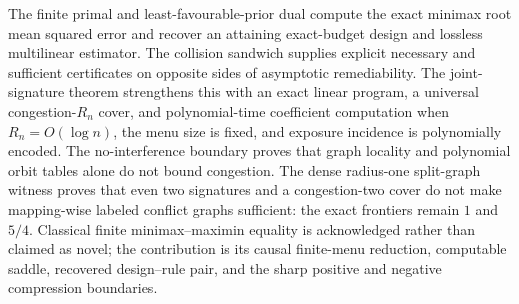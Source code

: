 The finite primal and least-favourable-prior dual compute the exact minimax root mean squared error and recover an attaining exact-budget design and lossless multilinear estimator. The collision sandwich supplies explicit necessary and sufficient certificates on opposite sides of asymptotic remediability. The joint-signature theorem strengthens this with an exact linear program, a universal congestion-\(R_n\) cover, and polynomial-time coefficient computation when \(R_n=O(\log n)\), the menu size is fixed, and exposure incidence is polynomially encoded. The no-interference boundary proves that graph locality and polynomial orbit tables alone do not bound congestion. The dense radius-one split-graph witness proves that even two signatures and a congestion-two cover do not make mapping-wise labeled conflict graphs sufficient: the exact frontiers remain \(1\) and \(5/4\). Classical finite minimax--maximin equality is acknowledged rather than claimed as novel; the contribution is its causal finite-menu reduction, computable saddle, recovered design--rule pair, and the sharp positive and negative compression boundaries.